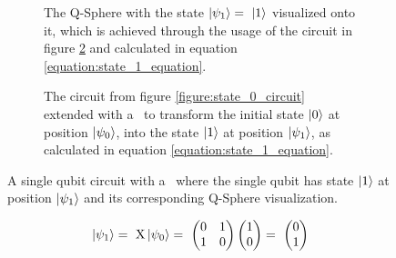\begin{figure}[!h]
    \begin{subfigure}{.5\textwidth}
        \centering
        \scalebox{\blochwidth}{
            
        }
        \caption{The Q-Sphere with the state $\ket{\psi_1} =\ \ket{1}$ visualized onto it, which is achieved through the usage of the circuit in figure \ref{figure:x_circuit} and calculated in equation \ref{equation:state_1_equation}.}
        \label{figure:state_1_q_sphere}
    \end{subfigure}
    \begin{subfigure}{.5\textwidth}
        \centering{}
        \caption{The circuit from figure \ref{figure:state_0_circuit} extended with a \xgate\ to transform the initial state $\ket{0}$ at position $\ket{\psi_0}$, into the state $\ket{1}$ at position $\ket{\psi_1}$, as calculated in equation \ref{equation:state_1_equation}.}
        \label{figure:x_circuit}
    \end{subfigure}
    \caption{A single qubit circuit with a \xgate\, where the single qubit has state $\ket{1}$ at position $\ket{\psi_1}$ and its corresponding Q-Sphere visualization.}
    \label{fig:showcase_qubit_state_1_with_circuit}
\end{figure}

\begin{equation}
    \centering
    \begin{split}
        \ket{\psi_1} =\ \mathrm{X}\ket{\psi_0} =\ \begin{pmatrix} 0 & 1\\ 1 & 0\end{pmatrix}\begin{pmatrix}1 \\ 0\end{pmatrix} =\ \begin{pmatrix}0 \\ 1 \end{pmatrix}\\
    \end{split}
    \label{equation:state_1_equation}
\end{equation}

